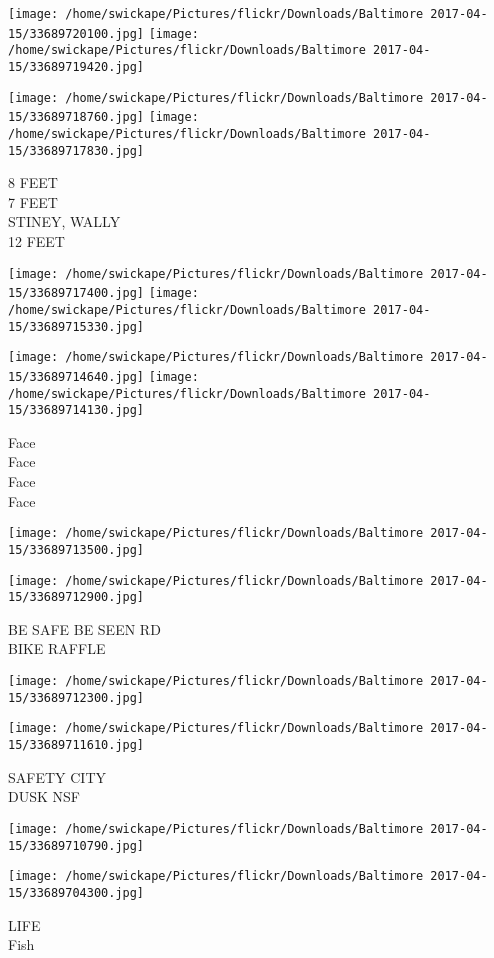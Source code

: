 \documentclass[10pt,letterpaper]{article}
\begin{document}
\texttt{[image: /home/swickape/Pictures/flickr/Downloads/Baltimore 2017-04-15/33689720100.jpg]}
\texttt{[image: /home/swickape/Pictures/flickr/Downloads/Baltimore 2017-04-15/33689719420.jpg]}

\texttt{[image: /home/swickape/Pictures/flickr/Downloads/Baltimore 2017-04-15/33689718760.jpg]}
\texttt{[image: /home/swickape/Pictures/flickr/Downloads/Baltimore 2017-04-15/33689717830.jpg]}

8 FEET\\
7 FEET\\
STINEY, WALLY\\
12 FEET\\
\pagebreak

\texttt{[image: /home/swickape/Pictures/flickr/Downloads/Baltimore 2017-04-15/33689717400.jpg]}
\texttt{[image: /home/swickape/Pictures/flickr/Downloads/Baltimore 2017-04-15/33689715330.jpg]}

\texttt{[image: /home/swickape/Pictures/flickr/Downloads/Baltimore 2017-04-15/33689714640.jpg]}
\texttt{[image: /home/swickape/Pictures/flickr/Downloads/Baltimore 2017-04-15/33689714130.jpg]}

Face\\
Face\\
Face\\
Face\\
\pagebreak

\texttt{[image: /home/swickape/Pictures/flickr/Downloads/Baltimore 2017-04-15/33689713500.jpg]}

\vspace{0.25in}
\texttt{[image: /home/swickape/Pictures/flickr/Downloads/Baltimore 2017-04-15/33689712900.jpg]}

BE SAFE BE SEEN RD\\
BIKE RAFFLE\\
\pagebreak

\texttt{[image: /home/swickape/Pictures/flickr/Downloads/Baltimore 2017-04-15/33689712300.jpg]}

\vspace{0.25in}
\texttt{[image: /home/swickape/Pictures/flickr/Downloads/Baltimore 2017-04-15/33689711610.jpg]}

SAFETY CITY\\
DUSK NSF\\
\pagebreak

\texttt{[image: /home/swickape/Pictures/flickr/Downloads/Baltimore 2017-04-15/33689710790.jpg]}

\vspace{0.25in}
\texttt{[image: /home/swickape/Pictures/flickr/Downloads/Baltimore 2017-04-15/33689704300.jpg]}

LIFE\\
Fish\\
\pagebreak
\end{document}
